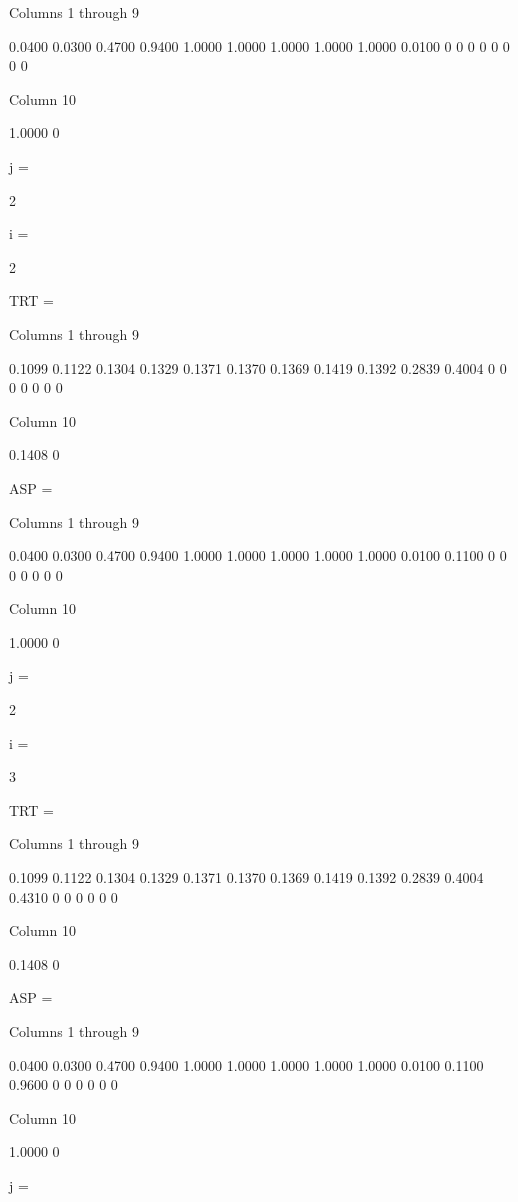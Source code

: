   Columns 1 through 9

    0.0400    0.0300    0.4700    0.9400    1.0000    1.0000    1.0000    1.0000    1.0000
    0.0100         0         0         0         0         0         0         0         0

  Column 10

    1.0000
         0


j =

     2


i =

     2


TRT =

  Columns 1 through 9

    0.1099    0.1122    0.1304    0.1329    0.1371    0.1370    0.1369    0.1419    0.1392
    0.2839    0.4004         0         0         0         0         0         0         0

  Column 10

    0.1408
         0


ASP =

  Columns 1 through 9

    0.0400    0.0300    0.4700    0.9400    1.0000    1.0000    1.0000    1.0000    1.0000
    0.0100    0.1100         0         0         0         0         0         0         0

  Column 10

    1.0000
         0


j =

     2


i =

     3


TRT =

  Columns 1 through 9

    0.1099    0.1122    0.1304    0.1329    0.1371    0.1370    0.1369    0.1419    0.1392
    0.2839    0.4004    0.4310         0         0         0         0         0         0

  Column 10

    0.1408
         0


ASP =

  Columns 1 through 9

    0.0400    0.0300    0.4700    0.9400    1.0000    1.0000    1.0000    1.0000    1.0000
    0.0100    0.1100    0.9600         0         0         0         0         0         0

  Column 10

    1.0000
         0


j =


